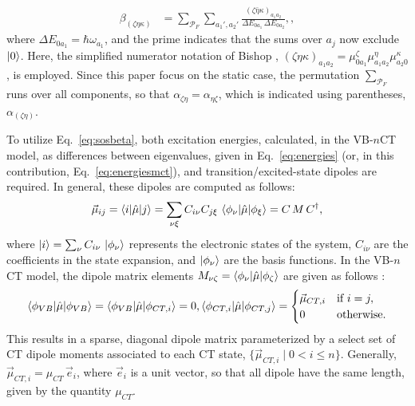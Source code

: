 \documentclass[journal=jpcafh]{achemso}
\begin{document}
\begin{align}
	\beta_{(\zeta\eta\kappa)} &=\sum_{\mathcal{P}_F} \sum_{a_1', a_2'} \frac{(\zeta\bar{\eta}\kappa)_{a_1 a_2}}{\Delta E_{0a_1}\,\Delta E_{0a_2}}, \label{eq:sosbeta},
\end{align}
where $\Delta E_{0a_1} = \hbar\omega_{a_1}$, and the prime indicates that the sums over $a_j$ now exclude $\ket{0}$.  Here, the simplified numerator notation of Bishop \cite{bishopExplicitNondivergentFormulas1994}, $(\zeta\eta\kappa)_{a_1 a_2} = \mu_{0 a_1}^\zeta \mu_{a_1 a_2}^\eta \mu_{a_2 0}^\kappa$, is employed. Since this paper focus on the static case, the permutation $\sum_{\mathcal P_F}$ runs over all components, so that $\alpha_{\zeta\eta} = \alpha_{\eta\zeta}$, which is indicated using parentheses, $\alpha_{(\zeta\eta)}$.

To utilize Eq.~\eqref{eq:sosbeta}, both excitation energies, calculated, in the VB-$n$CT model, as differences between eigenvalues, given in Eq.~\eqref{eq:energies} (or, in this contribution, Eq.~\eqref{eq:energiesmct}), and transition/excited-state dipoles are required. In general, these dipoles are computed as follows:
\begin{equation}
\vec{\mu}_{ij} = \braket{i | \hat{\mu} | j} = \sum_{\nu\xi} C_{i \nu} C_{j \xi} \, \braket{\phi_\nu | \hat{\mu} | \phi_\xi} = C\,M\,C^\dagger,
\end{equation}
where $\ket{i} = \sum_\nu C_{i \nu} \, \ket{\phi_\nu}$ represents the electronic states of the system, $C_{i \nu}$ are the coefficients in the state expansion, and $\ket{\phi_\nu}$ are the basis functions. 
In the VB-$n$CT model, the dipole matrix elements $M_{\nu\zeta} = \braket{\phi_\nu | \hat{\mu} | \phi_\zeta}$ are given as follows \cite{luValenceBondChargeTransferModel1994}:
\begin{align}
\braket{\phi_{VB} | \hat{\mu} | \phi_{VB}} = \braket{\phi_{VB} | \hat{\mu} | \phi_{CT,i}} = 0,
\braket{\phi_{CT,i} | \hat{\mu} | \phi_{CT,j}} = 
\begin{cases}
	\vec{\mu}_{CT,i} & \text{if } i = j, \\
	0 & \text{otherwise}.
\end{cases}
\end{align}
This results in a sparse, diagonal dipole matrix parameterized by a select set of CT dipole moments associated to each CT state, $\{\vec{\mu}_{CT,i} \mid 0 < i \leq n\}$. Generally, $\vec\mu_{CT, i} = \mu_{CT}\,\vec{e}_i$, where $\vec  e_i$ is a unit vector, so that all dipole have the same length, given by the quantity $\mu_{CT}$.  
\end{document}
